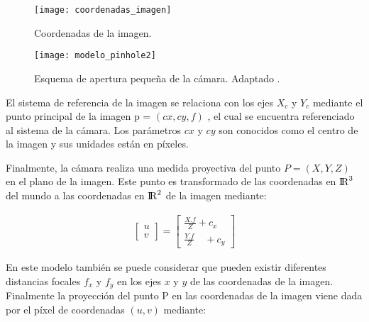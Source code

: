\begin{figure}[H]
	\centering
	\texttt{[image: coordenadas\_imagen]}
	\caption[Coordenadas de la imagen.]{Coordenadas de la imagen.}
	\label{imagen:coordenadas_imagen}
\end{figure}



\begin{figure}[H]
	\centering
	\texttt{[image: modelo\_pinhole2]}
	\caption[Esquema de apertura pequeña de la cámara]{Esquema de apertura pequeña de la cámara. Adaptado \protect\footnotemark.}
	\label{imagen:modelo_pinhole2}
\end{figure}

El sistema de referencia de la imagen se relaciona con los ejes $X_{c}$ y  $Y_{c}$ mediante el punto principal de la imagen p = $(cx, cy , f)$ , el cual  se encuentra referenciado al sistema de la cámara. Los parámetros $cx$ y $cy$ son conocidos como el centro de la imagen y sus unidades están en píxeles. 


Finalmente, la cámara realiza una medida proyectiva del punto $P = (X, Y, Z)$ en el plano de la imagen. 
Este punto es transformado de las coordenadas en ${\rm I\!R}^3$ del mundo a las coordenadas en ${\rm I\!R}^2$ de la imagen mediante:

\begin{equation}
\begin{matrix} \left[ \begin{matrix} u \\ v \end{matrix} \right] =\left[ \begin{matrix} \frac { X.{ f } }{ Z } +{ c }_{ x } \\ \frac { Y.{ f } }{ Z } \quad +{ c }_{ y } \end{matrix} \right]  \end{matrix}
\label{eq:ProyeccionCAMSimple}
\end{equation}



En este modelo también se puede considerar que pueden existir diferentes distancias focales $f_{x}$ y $f_{y}$  en los ejes $x$ y $y$ de las coordenadas de la imagen.  Finalmente la proyección del punto P en las coordenadas de la imagen viene dada por el píxel de coordenadas $(u, v)$ mediante:

